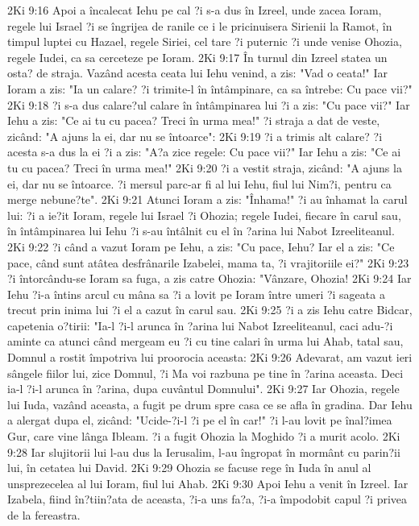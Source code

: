 2Ki 9:16  Apoi a încalecat Iehu pe cal ?i s-a dus în Izreel, unde zacea Ioram, regele lui Israel ?i se îngrijea de ranile ce i le pricinuisera Sirienii la Ramot, în timpul luptei cu Hazael, regele Siriei, cel tare ?i puternic ?i unde venise Ohozia, regele Iudei, ca sa cerceteze pe Ioram.
2Ki 9:17  În turnul din Izreel statea un osta? de straja. Vazând acesta ceata lui Iehu venind, a zis: "Vad o ceata!" Iar Ioram a zis: "Ia un calare? ?i trimite-l în întâmpinare, ca sa întrebe: Cu pace vii?"
2Ki 9:18  ?i s-a dus calare?ul calare în întâmpinarea lui ?i a zis: "Cu pace vii?" Iar Iehu a zis: "Ce ai tu cu pacea? Treci în urma mea!" ?i straja a dat de veste, zicând: "A ajuns la ei, dar nu se întoarce":
2Ki 9:19  ?i a trimis alt calare? ?i acesta s-a dus la ei ?i a zis: "A?a zice regele: Cu pace vii?" Iar Iehu a zis: "Ce ai tu cu pacea? Treci în urma mea!"
2Ki 9:20  ?i a vestit straja, zicând: "A ajuns la ei, dar nu se întoarce. ?i mersul parc-ar fi al lui Iehu, fiul lui Nim?i, pentru ca merge nebune?te".
2Ki 9:21  Atunci Ioram a zis: "Înhama!" ?i au înhamat la carul lui: ?i a ie?it Ioram, regele lui Israel ?i Ohozia; regele Iudei, fiecare în carul sau, în întâmpinarea lui Iehu ?i s-au întâlnit cu el în ?arina lui Nabot Izreeliteanul.
2Ki 9:22  ?i când a vazut Ioram pe Iehu, a zis: "Cu pace, Iehu? Iar el a zis: "Ce pace, când sunt atâtea desfrânarile Izabelei, mama ta, ?i vrajitoriile ei?"
2Ki 9:23  ?i întorcându-se Ioram sa fuga, a zis catre Ohozia: "Vânzare, Ohozia!
2Ki 9:24  Iar Iehu ?i-a întins arcul cu mâna sa ?i a lovit pe Ioram între umeri ?i sageata a trecut prin inima lui ?i el a cazut în carul sau.
2Ki 9:25  ?i a zis Iehu catre Bidcar, capetenia o?tirii: "Ia-l ?i-l arunca în ?arina lui Nabot Izreeliteanul, caci adu-?i aminte ca atunci când mergeam eu ?i cu tine calari în urma lui Ahab, tatal sau, Domnul a rostit împotriva lui proorocia aceasta:
2Ki 9:26  Adevarat, am vazut ieri sângele fiilor lui, zice Domnul, ?i Ma voi razbuna pe tine în ?arina aceasta. Deci ia-l ?i-l arunca în ?arina, dupa cuvântul Domnului".
2Ki 9:27  Iar Ohozia, regele lui Iuda, vazând aceasta, a fugit pe drum spre casa ce se afla în gradina. Dar Iehu a alergat dupa el, zicând: "Ucide-?i-l ?i pe el în car!" ?i l-au lovit pe înal?imea Gur, care vine lânga Ibleam. ?i a fugit Ohozia la Moghido ?i a murit acolo.
2Ki 9:28  Iar slujitorii lui l-au dus la Ierusalim, l-au îngropat în mormânt cu parin?ii lui, în cetatea lui David.
2Ki 9:29  Ohozia se facuse rege în Iuda în anul al unsprezecelea al lui Ioram, fiul lui Ahab.
2Ki 9:30  Apoi Iehu a venit în Izreel. Iar Izabela, fiind în?tiin?ata de aceasta, ?i-a uns fa?a, ?i-a împodobit capul ?i privea de la fereastra.
